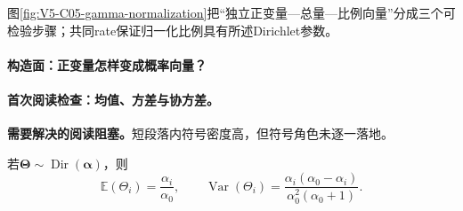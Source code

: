 \documentclass[UTF8,a4paper,11pt,openany]{ctexbook}
\begin{document}
\setcounter{page}{832}
\setcounter{chapter}{34}
\setcounter{figure}{4}
\setcounter{equation}{3}
\pagestyle{headings}
图\ref{fig:V5-C05-gamma-normalization}把“独立正变量—总量—比例向量”分成三个可检验步骤；共同rate保证归一化比例具有所述Dirichlet参数。

\paragraph{构造面：正变量怎样变成概率向量？}

\FloatBarrier

\paragraph{首次阅读检查：均值、方差与协方差。}\textbf{需要解决的阅读阻塞。}短段落内符号密度高，但符号角色未逐一落地。

\begin{proposition}[均值、方差与协方差]
若$\boldsymbol\Theta\sim\operatorname{Dir}(\boldsymbol\alpha)$，则
\[
\mathbb E(\Theta_i)=\frac{\alpha_i}{\alpha_0},\qquad
\operatorname{Var}(\Theta_i)=\frac{\alpha_i(\alpha_0-\alpha_i)}{\alpha_0^2(\alpha_0+1)}.
\]
\end{proposition}
\end{document}
